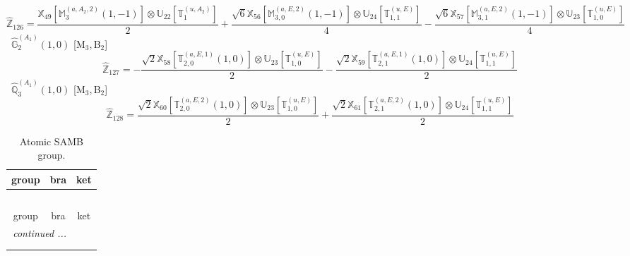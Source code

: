 \documentclass[fleqn,10pt,landscape]{article}
\begin{document}
\begin{itemize}
\begin{dmath*}
\hat{\mathbb{Z}}_{126}=\frac{\mathbb{X}_{49}[\mathbb{M}_{3}^{(a,A_{2},2)}(1,-1)] \otimes\mathbb{U}_{22}[\mathbb{T}_{1}^{(u,A_{2})}]}{2} + \frac{\sqrt{6} \mathbb{X}_{56}[\mathbb{M}_{3,0}^{(a,E,2)}(1,-1)] \otimes\mathbb{U}_{24}[\mathbb{T}_{1,1}^{(u,E)}]}{4} - \frac{\sqrt{6} \mathbb{X}_{57}[\mathbb{M}_{3,1}^{(a,E,2)}(1,-1)] \otimes\mathbb{U}_{23}[\mathbb{T}_{1,0}^{(u,E)}]}{4}
\end{dmath*}
\vspace{4mm}
\noindent {} $\,\,\,\hat{\mathbb{G}}_{2}^{(A_{1})}(1,0)$ [M$_{3}$,\,B$_{2}$]
\begin{dmath*}
\hat{\mathbb{Z}}_{127}=- \frac{\sqrt{2} \mathbb{X}_{58}[\mathbb{T}_{2,0}^{(a,E,1)}(1,0)] \otimes\mathbb{U}_{23}[\mathbb{T}_{1,0}^{(u,E)}]}{2} - \frac{\sqrt{2} \mathbb{X}_{59}[\mathbb{T}_{2,1}^{(a,E,1)}(1,0)] \otimes\mathbb{U}_{24}[\mathbb{T}_{1,1}^{(u,E)}]}{2}
\end{dmath*}
\vspace{4mm}
\noindent {} $\,\,\,\hat{\mathbb{Q}}_{3}^{(A_{1})}(1,0)$ [M$_{3}$,\,B$_{2}$]
\begin{dmath*}
\hat{\mathbb{Z}}_{128}=\frac{\sqrt{2} \mathbb{X}_{60}[\mathbb{T}_{2,0}^{(a,E,2)}(1,0)] \otimes\mathbb{U}_{23}[\mathbb{T}_{1,0}^{(u,E)}]}{2} + \frac{\sqrt{2} \mathbb{X}_{61}[\mathbb{T}_{2,1}^{(a,E,2)}(1,0)] \otimes\mathbb{U}_{24}[\mathbb{T}_{1,1}^{(u,E)}]}{2}
\end{dmath*}
\begin{center}
\renewcommand{\arraystretch}{1.3}
\begin{longtable}{c|c|c}
\caption{Atomic SAMB group.}
 \\
 \hline \hline
group & bra & ket \\ \hline \endfirsthead

\multicolumn{2}{l}{\tablename\ \thetable{}} \\
 \hline \hline
group & bra & ket \\ \hline \endhead

 \hline \hline
\multicolumn{2}{r}{\footnotesize\it continued ...} \\ \endfoot

 \hline \hline
\multicolumn{2}{r}{} \\ \endlastfoot


\end{longtable}
\end{center}
\end{itemize}
\end{document}
